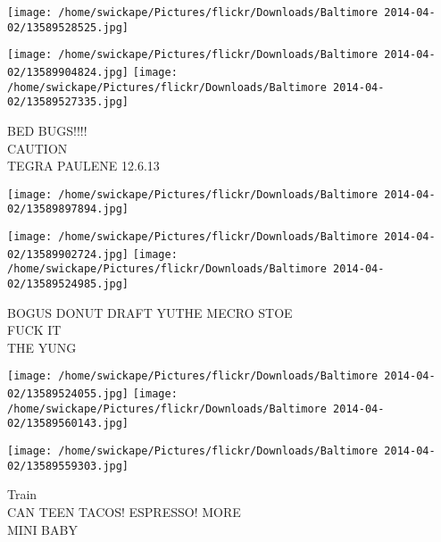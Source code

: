 \documentclass[10pt,letterpaper]{article}
\begin{document}
\texttt{[image: /home/swickape/Pictures/flickr/Downloads/Baltimore 2014-04-02/13589528525.jpg]}

\vspace{0.25in}
\texttt{[image: /home/swickape/Pictures/flickr/Downloads/Baltimore 2014-04-02/13589904824.jpg]}
\texttt{[image: /home/swickape/Pictures/flickr/Downloads/Baltimore 2014-04-02/13589527335.jpg]}

BED BUGS!!!!\\
CAUTION\\
TEGRA PAULENE 12.6.13
\pagebreak

\texttt{[image: /home/swickape/Pictures/flickr/Downloads/Baltimore 2014-04-02/13589897894.jpg]}

\vspace{0.25in}
\texttt{[image: /home/swickape/Pictures/flickr/Downloads/Baltimore 2014-04-02/13589902724.jpg]}
\texttt{[image: /home/swickape/Pictures/flickr/Downloads/Baltimore 2014-04-02/13589524985.jpg]}

BOGUS DONUT DRAFT YUTHE MECRO STOE\\
FUCK IT\\
THE YUNG
\pagebreak

\texttt{[image: /home/swickape/Pictures/flickr/Downloads/Baltimore 2014-04-02/13589524055.jpg]}
\texttt{[image: /home/swickape/Pictures/flickr/Downloads/Baltimore 2014-04-02/13589560143.jpg]}

\texttt{[image: /home/swickape/Pictures/flickr/Downloads/Baltimore 2014-04-02/13589559303.jpg]}

Train\\
CAN TEEN TACOS! ESPRESSO! MORE\\
MINI BABY
\pagebreak
\end{document}
